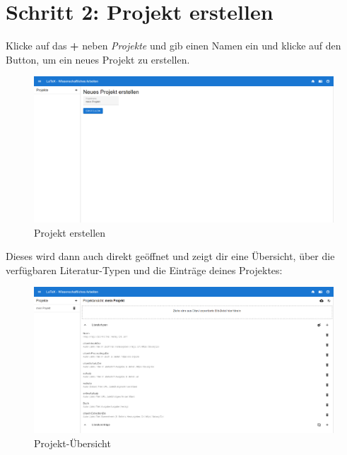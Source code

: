 \documentclass[12pt]{article}
\begin{document}
\section{Schritt 2: Projekt erstellen}
Klicke auf das \textbf{+} neben \textit{Projekte} und gib einen Namen ein und klicke auf den Button, um ein neues Projekt zu erstellen.
\FloatBarrier
\begin{figure}[!ht]
\includegraphics[width=.9\textwidth]{images/createProject.png}
\caption{Projekt erstellen}
\end{figure}
\FloatBarrier
\noindent Dieses wird dann auch direkt geöffnet und zeigt dir eine Übersicht, über die verfügbaren Literatur-Typen und die Einträge deines Projektes:
\FloatBarrier
\begin{figure}[!ht]
\includegraphics[width=.9\textwidth]{images/projectOverview.png}
\caption{Projekt-Übersicht}
\end{figure}
\FloatBarrier
\end{document}
